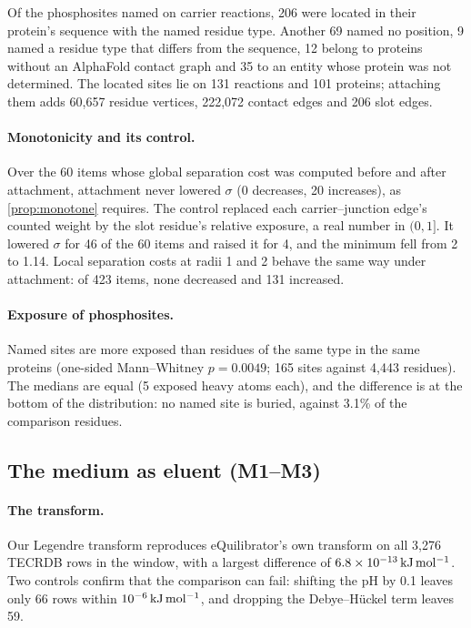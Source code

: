 Of the phosphosites named on carrier reactions, 206 were located in their protein's sequence with the named residue type.
Another 69 named no position, 9 named a residue type that differs from the sequence, 12 belong to proteins without an AlphaFold contact graph and 35 to an entity whose protein was not determined.
The located sites lie on 131 reactions and 101 proteins; attaching them adds 60{,}657 residue vertices, 222{,}072 contact edges and 206 slot edges.

\paragraph{Monotonicity and its control.}
Over the 60 items whose global separation cost was computed before and after attachment, attachment never lowered $\sigma$ (0 decreases, 20 increases), as \cref{prop:monotone} requires.
The control replaced each carrier--junction edge's counted weight by the slot residue's relative exposure, a real number in $(0,1]$.
It lowered $\sigma$ for 46 of the 60 items and raised it for 4, and the minimum fell from 2 to 1.14.
Local separation costs at radii 1 and 2 behave the same way under attachment: of 423 items, none decreased and 131 increased.

\paragraph{Exposure of phosphosites.}
Named sites are more exposed than residues of the same type in the same proteins (one-sided Mann--Whitney $p=0.0049$; 165 sites against 4{,}443 residues).
The medians are equal (5 exposed heavy atoms each), and the difference is at the bottom of the distribution: no named site is buried, against 3.1\% of the comparison residues.

\subsection{The medium as eluent (M1--M3)}
\label{sec:res-medium}

\paragraph{The transform.}
Our Legendre transform reproduces eQuilibrator's own transform on all 3{,}276 TECRDB rows in the window, with a largest difference of $6.8\times10^{-13}\,\mathrm{kJ\,mol^{-1}}$.
Two controls confirm that the comparison can fail: shifting the pH by 0.1 leaves only 66 rows within $10^{-6}\,\mathrm{kJ\,mol^{-1}}$, and dropping the Debye--H\"uckel term leaves 59.

